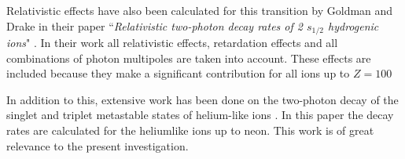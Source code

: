 
Relativistic effects have also been calculated for this transition by Goldman and Drake in their paper ``\textit{Relativistic two-photon decay rates of 2 \(s_{1/2}\) hydrogenic ions}" \cite{draketwoprel}. In their work all relativistic effects, retardation effects and all combinations of photon multipoles are taken into account. These effects are included because they make a significant contribution for all ions up to \(Z=100\)


In addition to this, extensive work has been done on the two-photon decay of the singlet and triplet metastable states of helium-like ions \cite{dalgarnohelium}. In this paper the decay rates are calculated for the heliumlike ions up to neon. This work is of great relevance to the present investigation. 


